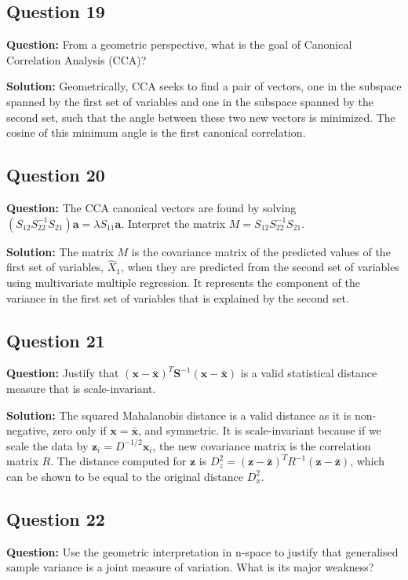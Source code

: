 \subsection*{Question 19}
\textbf{Question:} From a geometric perspective, what is the goal of Canonical Correlation Analysis (CCA)?

\textbf{Solution:}
Geometrically, CCA seeks to find a pair of vectors, one in the subspace spanned by the first set of variables and one in the subspace spanned by the second set, such that the angle between these two new vectors is minimized. The cosine of this minimum angle is the first canonical correlation.

\subsection*{Question 20}
\textbf{Question:} The CCA canonical vectors are found by solving $(S_{12}S_{22}^{-1}S_{21})\mathbf{a} = \lambda S_{11}\mathbf{a}$. Interpret the matrix $M = S_{12}S_{22}^{-1}S_{21}$.

\textbf{Solution:}
The matrix $M$ is the covariance matrix of the predicted values of the first set of variables, $\hat{X}_1$, when they are predicted from the second set of variables using multivariate multiple regression. It represents the component of the variance in the first set of variables that is explained by the second set.

\subsection*{Question 21}
\textbf{Question:} Justify that $(\mathbf{x}-\bar{\mathbf{x}})^{T}\mathbf{S}^{-1}(\mathbf{x}-\bar{\mathbf{x}})$ is a valid statistical distance measure that is scale-invariant.

\textbf{Solution:}
The squared Mahalanobis distance is a valid distance as it is non-negative, zero only if $\mathbf{x}=\bar{\mathbf{x}}$, and symmetric. It is scale-invariant because if we scale the data by $\mathbf{z}_i = D^{-1/2}\mathbf{x}_i$, the new covariance matrix is the correlation matrix $R$. The distance computed for $\mathbf{z}$ is $D_z^2 = (\mathbf{z}-\bar{\mathbf{z}})^{T}R^{-1}(\mathbf{z}-\bar{\mathbf{z}})$, which can be shown to be equal to the original distance $D_x^2$.

\subsection*{Question 22}
\textbf{Question:} Use the geometric interpretation in n-space to justify that generalised sample variance is a joint measure of variation. What is its major weakness?

